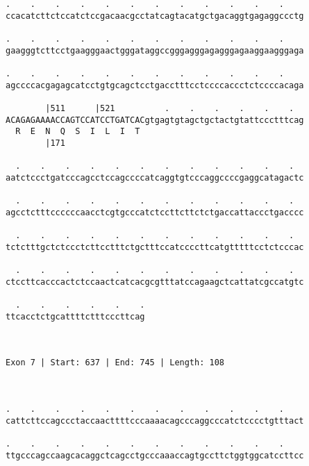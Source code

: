\documentclass{article}
\begin{document}
\begin{Verbatim}
.    .    .    .    .    .    .    .    .    .    .    .    
ccacatcttctccatctccgacaacgcctatcagtacatgctgacaggtgagaggccctg
                                                            
.    .    .    .    .    .    .    .    .    .    .    .    
gaagggtcttcctgaagggaactgggataggccgggagggagagggagaaggaagggaga
                                                            
.    .    .    .    .    .    .    .    .    .    .    .    
agccccacgagagcatcctgtgcagctcctgacctttcctccccaccctctccccacaga
                                                            
        |511      |521          .    .    .    .    .    .  
ACAGAGAAAACCAGTCCATCCTGATCACgtgagtgtagctgctactgtattccctttcag
  R  E  N  Q  S  I  L  I  T                                 
        |171                                                
  
  .    .    .    .    .    .    .    .    .    .    .    .  
aatctccctgatcccagcctccagccccatcaggtgtcccaggccccgaggcatagactc
                                                            
  .    .    .    .    .    .    .    .    .    .    .    .  
agcctctttccccccaacctcgtgcccatctccttcttctctgaccattaccctgacccc
                                                            
  .    .    .    .    .    .    .    .    .    .    .    .  
tctctttgctctccctcttcctttctgctttccatccccttcatgtttttcctctcccac
                                                            
  .    .    .    .    .    .    .    .    .    .    .    .  
ctccttcacccactctccaactcatcacgcgtttatccagaagctcattatcgccatgtc
                                                            
  .    .    .    .    .    .
ttcacctctgcattttctttcccttcag
                            
                            
 
Exon 7 | Start: 637 | End: 745 | Length: 108



.    .    .    .    .    .    .    .    .    .    .    .    
cattcttccagccctaccaacttttcccaaaacagcccaggcccatctcccctgtttact
                                                            
.    .    .    .    .    .    .    .    .    .    .    .    
ttgcccagccaagcacaggctcagcctgcccaaaccagtgccttctggtggcatccttcc
                                                            

\end{Verbatim}
\end{document}
